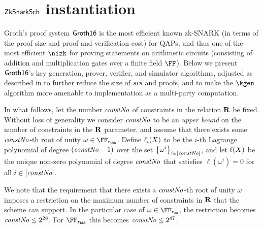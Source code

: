 
\section{$\mathsf{ZkSnarkSch}$ instantiation}\label{instantiation:zksnark}

Groth's proof system $\mathsf{Groth16}$ \cite{groth2016size} is the most efficient known zk-SNARK (in terms of the proof size and proof and verification cost) for QAPs, and thus one of the most efficient $\nizk$ for proving statements on arithmetic circuits (consisting of addition and multiplication gates over a finite field $\FF$). Below we present $\mathsf{Groth16}$'s key generation, prover, verifier, and simulator algorithms, adjusted as described in \cite{bowe2017mpc} to further reduce the size of $\mathit{srs}$ and proofs, and to make the $\kgen$ algorithm more amenable to implementation as a multi-party computation.

In what follows, let the number $\mathit{constNo}$ of constraints in the relation $\mathbf{R}$ be fixed. Without loss of generality we consider $\mathit{constNo}$ to be an \emph{upper bound} on the number of constraints in the $\mathbf{R}$ parameter, and assume that there exists some $\mathit{constNo}$-th root of unity $\omega \in \FFx{\rCURVE}$. Define $\ell_i(X)$ to be the $i$-th Lagrange polynomial of degree $(\mathit{constNo} - 1)$ over the set $\left\{{\omega^i}\right\}_{i \in [\mathit{constNo}]}$, and let $\ell(X)$ be the unique non-zero polynomial of degree $\mathit{constNo}$ that satisfies $\ell(\omega^i) = 0$ for all $i \in [\mathit{constNo}]$.

We note that the requirement that there exists a $\mathit{constNo}$-th root of unity $\omega$ imposes a restriction on the maximum number of constraints in $\mathbf{R}$ that the scheme can support. In the particular case of $\omega \in \FFx{\rBN}$, the restriction becomes $\mathit{constNo} \leq 2^{28}$. For $\FFx{\rBLS}$ this becomes $\mathit{constNo} \leq 2^{47}$.


